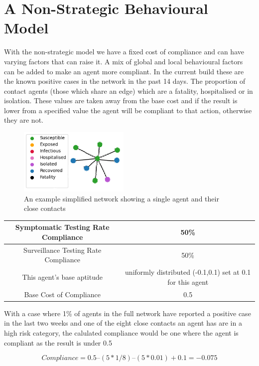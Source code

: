 \documentclass{article}
\begin{document}
\newpage

\section{A Non-Strategic Behavioural Model}
With the non-strategic model we have a fixed cost of compliance and can have varying factors that can raise it. A mix of global and local behavioural factors can be added to make an agent more compliant. In the current build these are the known positive cases in the network in the past 14 days. The proportion of contact agents (those which share an edge) which are a fatality, hospitalised or in isolation. These values are taken away from the base cost and if the result is lower from a specified value the agent will be compliant to that action, otherwise they are not.\newline



\begin{figure}[h!]
\centering
\includegraphics[width =150pt]{basicnet}
\caption{An example simplified network showing a single agent and their close contacts}
\end{figure}


\begin{tabular}{|c|c|}
\hline
Symptomatic Testing Rate Compliance & 50\% \\ \hline
Surveillance Testing Rate Compliance & 50\% \\ \hline
This agent’s base aptitude & uniformly distributed (-0.1,0.1) set at 0.1 for this agent \\ \hline
Base Cost of Compliance & 0.5 \\ \hline
\end{tabular}
\newline

With a case where 1\% of agents in the full network have reported a positive case in the last two weeks and one of the eight close contacts an agent has are in a high risk category, the calulated compliance would be one where the agent is compliant as the result is under 0.5

\[Compliance = 0.5 – (5 * 1/8) – (5*0.01) + 0.1 = -0.075\]
\newline
\end{document}
